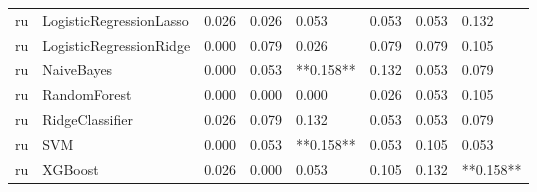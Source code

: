 \begin{tabular}{llllllll}
      ru &      LogisticRegressionLasso & 0.026 &                     0.026 &                 0.053 &                  0.053 &                                   0.053 &     0.132 \\
      ru &      LogisticRegressionRidge & 0.000 &                     0.079 &                 0.026 &                  0.079 &                                   0.079 &     0.105 \\
      ru &                   NaiveBayes & 0.000 &                     0.053 &             **0.158** &                  0.132 &                                   0.053 &     0.079 \\
      ru &                 RandomForest & 0.000 &                     0.000 &                 0.000 &                  0.026 &                                   0.053 &     0.105 \\
      ru &              RidgeClassifier & 0.026 &                     0.079 &                 0.132 &                  0.053 &                                   0.053 &     0.079 \\
      ru &                          SVM & 0.000 &                     0.053 &             **0.158** &                  0.053 &                                   0.105 &     0.053 \\
      ru &                      XGBoost & 0.026 &                     0.000 &                 0.053 &                  0.105 &                                   0.132 & **0.158** \\
\bottomrule
\end{tabular}
